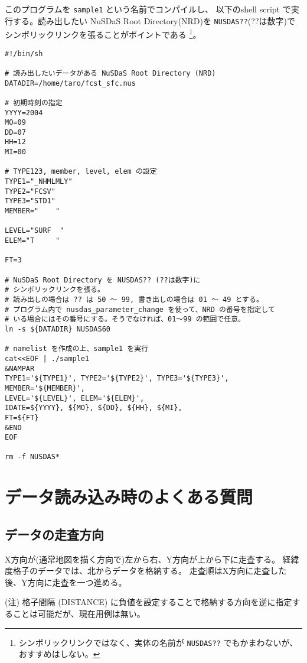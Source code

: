 このプログラムを {\tt sample1} という名前でコンパイルし、
以下のshell script で実行する。読み出したい NuSDaS Root Directory(NRD)を
{\tt NUSDAS??}(??は数字)でシンボリックリンクを張ることがポイントである%
\footnote{
シンボリックリンクではなく、実体の名前が {\tt NUSDAS??} でもかまわないが、
おすすめはしない。
}。

\begin{verbatim}
#!/bin/sh

# 読み出したいデータがある NuSDaS Root Directory (NRD)
DATADIR=/home/taro/fcst_sfc.nus

# 初期時刻の指定
YYYY=2004
MO=09
DD=07
HH=12
MI=00

# TYPE123, member, level, elem の設定
TYPE1="_NHMLMLY"
TYPE2="FCSV"
TYPE3="STD1"
MEMBER="    "

LEVEL="SURF  "
ELEM="T     "

FT=3

# NuSDaS Root Directory を NUSDAS?? (??は数字)に
# シンボリックリンクを張る。
# 読み出しの場合は ?? は 50 〜 99, 書き出しの場合は 01 〜 49 とする。
# プログラム内で nusdas_parameter_change を使って、NRD の番号を指定して
# いる場合にはその番号にする。そうでなければ、01〜99 の範囲で任意。
ln -s ${DATADIR} NUSDAS60

# namelist を作成の上、sample1 を実行
cat<<EOF | ./sample1
&NAMPAR
TYPE1='${TYPE1}', TYPE2='${TYPE2}', TYPE3='${TYPE3}', MEMBER='${MEMBER}', 
LEVEL='${LEVEL}', ELEM='${ELEM}', 
IDATE=${YYYY}, ${MO}, ${DD}, ${HH}, ${MI}, 
FT=${FT}
&END
EOF

rm -f NUSDAS*
\end{verbatim}


\section{データ読み込み時のよくある質問}

\subsection{データの走査方向}
X方向が(通常地図を描く方向で)左から右、Y方向が上から下に走査する。
経緯度格子のデータでは、北からデータを格納する。
走査順はX方向に走査した後、Y方向に走査を一つ進める。

(注) 格子間隔 (DISTANCE) に負値を設定することで格納する方向を逆に指定することは可能だが、現在用例は無い。

